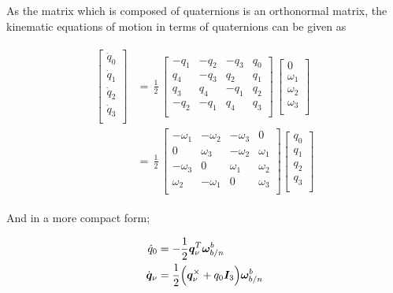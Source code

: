 As the matrix which is composed of quaternions is an orthonormal matrix, the kinematic equations of motion in terms of quaternions can be given as \cite{wie2008space}

\begin{align} \label{eqn:kinematicArrange}
\begin{split}
\begin{bmatrix}
\dot{q}_0\\[0.2em]
\dot{q}_1\\[0.2em]
\dot{q}_2\\[0.2em]
\dot{q}_3\\[0.2em]
\end{bmatrix}
& =\,
\frac{1}{2}
\,
\begin{bmatrix}
-q_1 & -q_2 & -q_3 & q_0 \\[0.2em]
q_4 & -q_3 & q_2 & q_1 \\[0.2em]
q_3 & q_4 & -q_1 & q_2 \\[0.2em]
-q_2 & -q_1 & q_4 & q_3 \\[0.2em]
\end{bmatrix}
\,
\begin{bmatrix}
0\\[0.2em]
\omega_1\\[0.2em]
\omega_2\\[0.2em]
\omega_3\\[0.2em]
\end{bmatrix} \\
& =\,
\frac{1}{2}
\,
\begin{bmatrix}
-\omega_1 & -\omega_2 & -\omega_3 & 0 \\[0.2em]
0 & \omega_3 & -\omega_2 & \omega_1 \\[0.2em]
-\omega_3 & 0 & \omega_1 & \omega_2 \\[0.2em]
\omega_2 & -\omega_1 & 0 & \omega_3 \\[0.2em]
\end{bmatrix}
\begin{bmatrix}
q_0\\[0.2em]
q_1\\[0.2em]
q_2\\[0.2em]
q_3\\[0.2em]
\end{bmatrix}
\end{split}
\end{align}

And in a more compact form;

\begin{align}{\label{eqn:compactKinematics}}
\begin{split}
\dot{q}_0 &= -\frac{1}{2} \bm{q}_\nu^T \bm{\omega}_{b/n}^b\\
\dot{\bm{q}}_\nu &= \frac{1}{2}\Big(\bm{q}_\nu^\times + q_0 \bm{I}_3 \Big) \bm{\omega}_{b/n}^b \\
\end{split}
\end{align}

